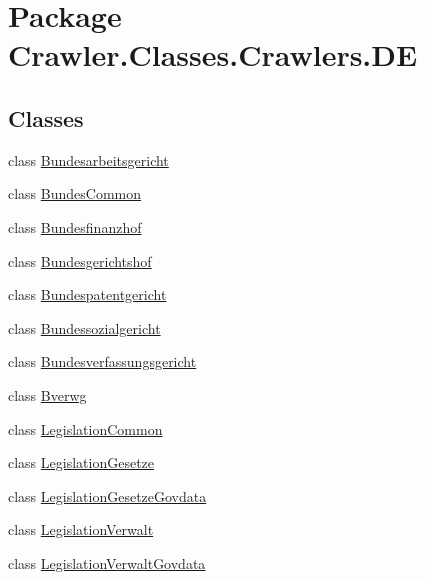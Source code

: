 \hypertarget{namespace_crawler_1_1_classes_1_1_crawlers_1_1_d_e}{\section{Package Crawler.\-Classes.\-Crawlers.\-D\-E}
\label{namespace_crawler_1_1_classes_1_1_crawlers_1_1_d_e}
}
\subsection*{Classes}
\begin{DoxyCompactItemize}
\item 
class \hyperlink{class_crawler_1_1_classes_1_1_crawlers_1_1_d_e_1_1_bundesarbeitsgericht}{Bundesarbeitsgericht}
\item 
class \hyperlink{class_crawler_1_1_classes_1_1_crawlers_1_1_d_e_1_1_bundes_common}{Bundes\-Common}
\item 
class \hyperlink{class_crawler_1_1_classes_1_1_crawlers_1_1_d_e_1_1_bundesfinanzhof}{Bundesfinanzhof}
\item 
class \hyperlink{class_crawler_1_1_classes_1_1_crawlers_1_1_d_e_1_1_bundesgerichtshof}{Bundesgerichtshof}
\item 
class \hyperlink{class_crawler_1_1_classes_1_1_crawlers_1_1_d_e_1_1_bundespatentgericht}{Bundespatentgericht}
\item 
class \hyperlink{class_crawler_1_1_classes_1_1_crawlers_1_1_d_e_1_1_bundessozialgericht}{Bundessozialgericht}
\item 
class \hyperlink{class_crawler_1_1_classes_1_1_crawlers_1_1_d_e_1_1_bundesverfassungsgericht}{Bundesverfassungsgericht}
\item 
class \hyperlink{class_crawler_1_1_classes_1_1_crawlers_1_1_d_e_1_1_bverwg}{Bverwg}
\item 
class \hyperlink{class_crawler_1_1_classes_1_1_crawlers_1_1_d_e_1_1_legislation_common}{Legislation\-Common}
\item 
class \hyperlink{class_crawler_1_1_classes_1_1_crawlers_1_1_d_e_1_1_legislation_gesetze}{Legislation\-Gesetze}
\item 
class \hyperlink{class_crawler_1_1_classes_1_1_crawlers_1_1_d_e_1_1_legislation_gesetze_govdata}{Legislation\-Gesetze\-Govdata}
\item 
class \hyperlink{class_crawler_1_1_classes_1_1_crawlers_1_1_d_e_1_1_legislation_verwalt}{Legislation\-Verwalt}
\item 
class \hyperlink{class_crawler_1_1_classes_1_1_crawlers_1_1_d_e_1_1_legislation_verwalt_govdata}{Legislation\-Verwalt\-Govdata}
\end{DoxyCompactItemize}
